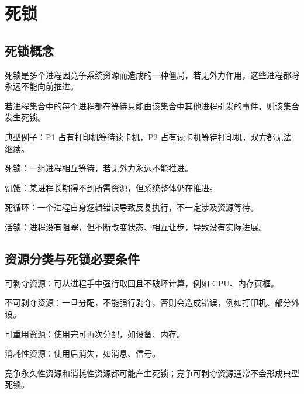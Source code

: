 
\chapter{死锁}

\section{死锁概念}
\begin{points}
  \item 死锁是多个进程因竞争系统资源而造成的一种僵局，若无外力作用，这些进程都将永远不能向前推进。
  \item 若进程集合中的每个进程都在等待只能由该集合中其他进程引发的事件，则该集合发生死锁。
  \item 典型例子：P1 占有打印机等待读卡机，P2 占有读卡机等待打印机，双方都无法继续。
\end{points}


\begin{points}
  \item 死锁：一组进程相互等待，若无外力永远不能推进。
  \item 饥饿：某进程长期得不到所需资源，但系统整体仍在推进。
  \item 死循环：一个进程自身逻辑错误导致反复执行，不一定涉及资源等待。
  \item 活锁：进程没有阻塞，但不断改变状态、相互让步，导致没有实际进展。
\end{points}


\section{资源分类与死锁必要条件}
\begin{points}
  \item 可剥夺资源：可从进程手中强行取回且不破坏计算，例如 CPU、内存页框。
  \item 不可剥夺资源：一旦分配，不能强行剥夺，否则会造成错误，例如打印机、部分外设。
  \item 可重用资源：使用完可再次分配，如设备、内存。
  \item 消耗性资源：使用后消失，如消息、信号。
  \item 竞争永久性资源和消耗性资源都可能产生死锁；竞争可剥夺资源通常不会形成典型死锁。
\end{points}


